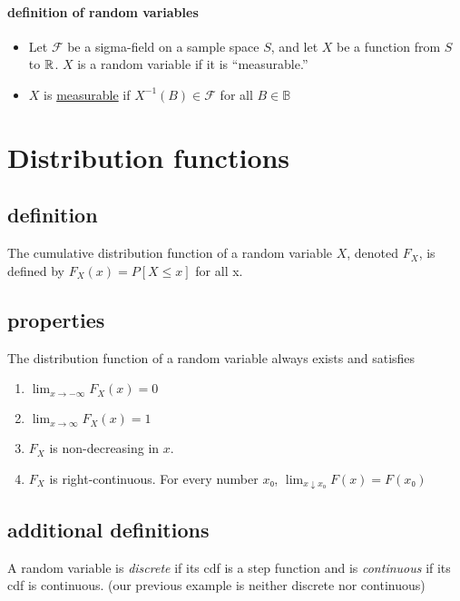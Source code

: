 \paragraph{definition of random variables}

\begin{itemize}
\item Let $\mathcal{F}$ be a sigma-field on a sample space $S$, and
        let $X$ be a function from $S$ to $\mathbb{R}$.  $X$ is a random
        variable if it is ``measurable.''
\item $X$ is \underline{measurable} if $X^{-1}(B) ∈ \mathcal{F}$ for all $B
        ∈ \mathbb{B}$
\end{itemize}

\section{Distribution functions}

\subsection{definition}

     The cumulative distribution function of a random variable $X$,
     denoted $F_X$, is defined by $F_X(x) = P[X ≤ x]$ for all x.

\subsection{properties}

     The distribution function of a random variable always exists and
     satisfies
\begin{enumerate}
\item $\lim_{x → -∞} F_X(x) = 0$
\item $\lim_{x → ∞} F_X(x) = 1$
\item $F_X$ is non-decreasing in $x$.
\item $F_X$ is right-continuous.  For every number $x₀$, $\lim_{x
        \downarrow x₀} F(x) = F(x₀)$
\end{enumerate}

\subsection{additional definitions}

     A random variable is \emph{discrete} if its cdf is a step function and
     is \emph{continuous} if its cdf is continuous.  (our previous example is
     neither discrete nor continuous)


